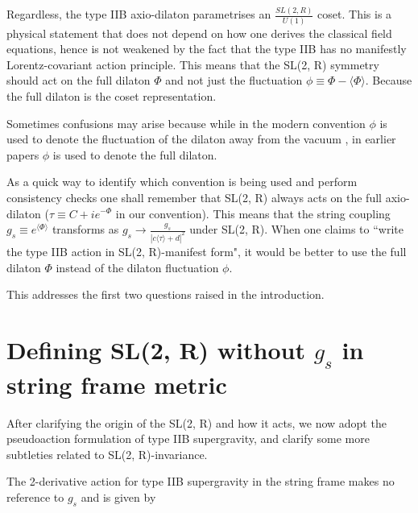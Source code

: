 Regardless, the type IIB axio-dilaton parametrises an $\frac{SL(2, R)}{U(1)}$ coset. 
This is a physical statement that does not depend on how one derives the classical field equations, hence is not weakened by the fact that the type IIB has no manifestly Lorentz-covariant action principle.
This means that the SL(2, R) symmetry should act on the full dilaton $\Phi$ and not just the fluctuation $\phi \equiv \Phi - \langle\Phi\rangle$.
Because the full dilaton is the coset representation.

Sometimes confusions may arise because while in the modern convention $\phi$ is used to denote the fluctuation of the dilaton away from the vacuum \cite{ValeixoBento:2025emh}, in earlier papers \cite{Schwarz:1995dk} $\phi$ is used to denote the full dilaton. 

As a quick way to identify which convention is being used and perform consistency checks one shall remember that SL(2, R) always acts on the full axio-dilaton ($\tau \equiv C + i e^{-\Phi}$ in our convention).
This means that the string coupling $g_s \equiv e^{\langle\Phi\rangle}$ transforms as $g_s \to \frac{g_s}{|c\langle\tau\rangle + d|^2}$ under SL(2, R).
When one claims to ``write the type IIB action in SL(2, R)-manifest form", it would be better to use the full dilaton $\Phi$ instead of the dilaton fluctuation $\phi$.

This addresses the first two questions raised in the introduction.


\section{Defining SL(2, R) without $g_s$ in string frame metric}

After clarifying the origin of the SL(2, R) and how it acts, we now adopt the pseudoaction formulation of type IIB supergravity, and clarify some more subtleties related to SL(2, R)-invariance.

The 2-derivative action for type IIB supergravity in the string frame makes no reference to $g_s$ and is given by


